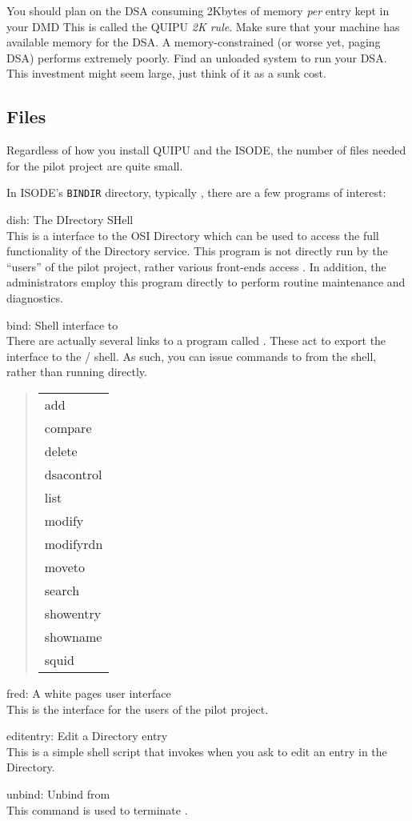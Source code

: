 You should plan on the DSA consuming 2Kbytes of memory {\em per\/} entry kept
in your DMD
This is called the QUIPU {\em 2K rule}.
Make sure that your machine has available memory for the DSA.
A memory-constrained (or worse yet, paging DSA) performs extremely poorly.
Find an unloaded system to run your DSA.
This investment might seem large,
just think of it as a sunk cost.

\subsection	{Files}
Regardless of how you install QUIPU and the ISODE,
the number of files needed for the pilot project are quite small.

In ISODE's \verb"BINDIR" directory,
typically ,
there are a few programs of interest:
\begin{describe}
\item[dish:]	The DIrectory SHell\\
		This is a interface to the OSI Directory which can be used to
		access the full functionality of the Directory service.
		This program is not directly run by the ``users'' of the pilot
		project, rather various front-ends access .
		In addition,
		the administrators employ this program directly to perform
		routine maintenance and diagnostics.

\item[bind:]	Shell interface to \\
		There are actually several links to a program called
		.
		These act to export the  interface to the \unix/
		shell.
		As such,
		you can issue commands to  from the shell,
		rather than running  directly.
\begin{quote}
\begin{tabular}{l}
add\\
compare\\
delete\\
dsacontrol\\
list\\
modify\\
modifyrdn\\
moveto\\
search\\
showentry\\
showname\\
squid
\end{tabular}
\end{quote}

\item[fred:]	A white pages user interface\\
		This is the interface for the users of the pilot project.

\item[editentry:]	Edit a Directory entry\\
		This is a simple shell script that  invokes when you
		ask  to edit an entry in the Directory.

\item[unbind:]	Unbind from \\
		This command is used to terminate .
\end{describe}
